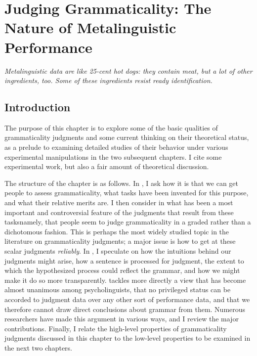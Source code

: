 \chapter[Judging Grammaticality]{Judging Grammaticality: The Nature of Metalinguistic Performance}\label{sec:3}

\epigraph{\textit{Metalinguistic data are like 25-cent hot dogs: they contain meat, but a lot of other ingredients, too. Some of these ingredients resist ready identification.\\[-2\baselineskip]}}{\citep{Birdsong1989}}
\section{Introduction} \label{sec:3.1}

The purpose of this chapter  is to explore some of the basic qualities of grammaticality judgments and some current thinking on their theoretical status, as a prelude to examining detailed studies of their behavior under various experimental manipulations in the two subsequent chapters. I cite some experimental work, but also a fair amount of theoretical discussion.

The structure of the chapter is as follows. In , I ask how it is that we can get people to assess grammaticality, what tasks have been invented for this purpose, and what their relative merits are. I then consider in  what has been a most important and controversial feature of the judgments that result from these tasks\schdash{}namely, that people seem to judge grammaticality in a graded rather than a dichotomous fashion. This is perhaps the most widely studied topic in the literature on grammaticality judgments; a major issue is how to get at these scalar judgments \textit{reliably}.  In , I  speculate on how the intuitions behind our judgments might arise, how a sentence is processed for judgment,  the extent to which the hypothesized process could reflect the grammar, and how we might make it do so more transparently.  tackles more directly a view that has become almost unanimous among psycholinguists, that no privileged status can be accorded to judgment data over any other sort of performance data, and that we therefore cannot draw direct conclusions about grammar from them. Numerous researchers have made this argument in various ways, and I review the
major contributions. Finally, I relate the high-level properties of grammaticality judgments discussed in this chapter to the low-level properties to be examined in the next two chapters.


